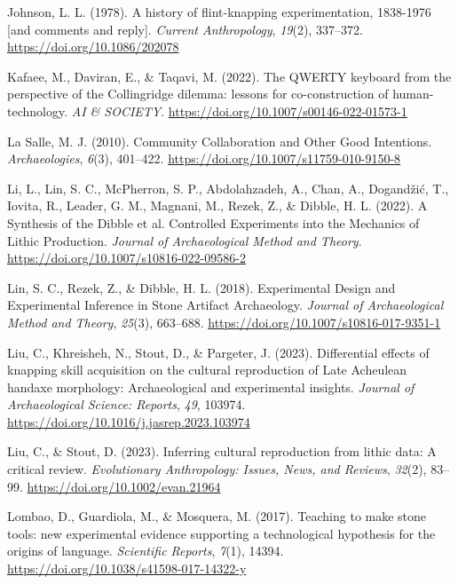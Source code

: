 \documentclass[
  11pt,
  letterpaper,
  DIV=11,
  numbers=noendperiod]{scrartcl}
\newlength{\cslhangindent}
\newenvironment{CSLReferences}[2] %
 {\begin{list}{}{%
  \setlength{\itemindent}{0pt}
  \setlength{\leftmargin}{0pt}
  \setlength{\parsep}{0pt}
  \ifodd #1
   \setlength{\leftmargin}{\cslhangindent}
   \setlength{\itemindent}{-1\cslhangindent}
  \fi
  \setlength{\itemsep}{#2\baselineskip}}}
 {\end{list}}
\begin{document}
\begin{CSLReferences}{1}{0}
Johnson, L. L. (1978). A history of flint-knapping experimentation,
1838-1976 {[}and comments and reply{]}. \emph{Current Anthropology},
\emph{19}(2), 337--372. \url{https://doi.org/10.1086/202078}

Kafaee, M., Daviran, E., \& Taqavi, M. (2022). The QWERTY keyboard from
the perspective of the Collingridge dilemma: lessons for co-construction
of human-technology. \emph{AI \& SOCIETY}.
\url{https://doi.org/10.1007/s00146-022-01573-1}

La Salle, M. J. (2010). Community Collaboration and Other Good
Intentions. \emph{Archaeologies}, \emph{6}(3), 401--422.
\url{https://doi.org/10.1007/s11759-010-9150-8}

Li, L., Lin, S. C., McPherron, S. P., Abdolahzadeh, A., Chan, A.,
Dogandžić, T., Iovita, R., Leader, G. M., Magnani, M., Rezek, Z., \&
Dibble, H. L. (2022). A Synthesis of the Dibble et al. Controlled
Experiments into the Mechanics of Lithic Production. \emph{Journal of
Archaeological Method and Theory}.
\url{https://doi.org/10.1007/s10816-022-09586-2}

Lin, S. C., Rezek, Z., \& Dibble, H. L. (2018). Experimental Design and
Experimental Inference in Stone Artifact Archaeology. \emph{Journal of
Archaeological Method and Theory}, \emph{25}(3), 663--688.
\url{https://doi.org/10.1007/s10816-017-9351-1}

Liu, C., Khreisheh, N., Stout, D., \& Pargeter, J. (2023). Differential
effects of knapping skill acquisition on the cultural reproduction of
Late Acheulean handaxe morphology: Archaeological and experimental
insights. \emph{Journal of Archaeological Science: Reports}, \emph{49},
103974. \url{https://doi.org/10.1016/j.jasrep.2023.103974}

Liu, C., \& Stout, D. (2023). Inferring cultural reproduction from
lithic data: {A} critical review. \emph{Evolutionary Anthropology:
Issues, News, and Reviews}, \emph{32}(2), 83--99.
\url{https://doi.org/10.1002/evan.21964}

Lombao, D., Guardiola, M., \& Mosquera, M. (2017). Teaching to make
stone tools: new experimental evidence supporting a technological
hypothesis for the origins of language. \emph{Scientific Reports},
\emph{7}(1), 14394. \url{https://doi.org/10.1038/s41598-017-14322-y}


\end{CSLReferences}
\end{document}
